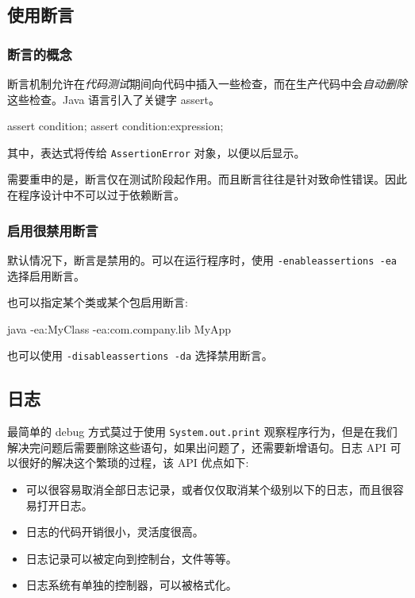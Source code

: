 \subsection{使用断言}

\subsubsection{断言的概念}

断言机制允许在\textit{代码测试}期间向代码中插入一些检查，而在生产代码中会\textit{自动删除}这些检查。Java 语言引入了关键字 assert。

\begin{Java}
assert condition;
assert condition:expression;
\end{Java}

其中，表达式将传给 \texttt{AssertionError} 对象，以便以后显示。

需要重申的是，断言仅在测试阶段起作用。而且断言往往是针对致命性错误。因此在程序设计中不可以过于依赖断言。

\subsubsection{启用很禁用断言}

默认情况下，断言是禁用的。可以在运行程序时，使用 \texttt{-enableassertions -ea} 选择启用断言。

也可以指定某个类或某个包启用断言:
\begin{Java}
java -ea:MyClass -ea:com.company.lib MyApp
\end{Java}

也可以使用 \texttt{-disableassertions -da} 选择禁用断言。

\subsection{日志}

最简单的 debug 方式莫过于使用 \texttt{System.out.print} 观察程序行为，但是在我们解决完问题后需要删除这些语句，如果出问题了，还需要新增语句。日志 API 可以很好的解决这个繁琐的过程，该 API 优点如下:

\begin{itemize}
    \item 可以很容易取消全部日志记录，或者仅仅取消某个级别以下的日志，而且很容易打开日志。
    \item 日志的代码开销很小，灵活度很高。
    \item 日志记录可以被定向到控制台，文件等等。
    \item 日志系统有单独的控制器，可以被格式化。
\end{itemize}

